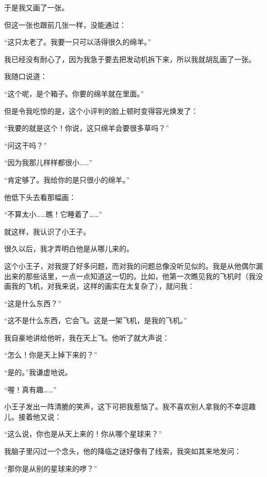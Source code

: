 于是我又画了一张。

但这一张也跟前几张一样，没能通过：

“这只太老了。我要一只可以活得很久的绵羊。”

我已经没有耐心了，因为我急于要去把发动机拆下来，所以我就胡乱画了一张。

我随口说道：

“这个呢，是个箱子。你要的绵羊就在里面。”

但是令我吃惊的是，这个小评判的脸上顿时变得容光焕发了：

“我要的就是这个！你说，这只绵羊会要很多草吗？”

“问这干吗？”

“因为我那儿样样都很小\ldots{}\ldots{}”

“肯定够了。我给你的是只很小的绵羊。”

{\startalignment[center]
 \stopalignment}

他低下头去看那幅画：

“不算太小\ldots{}\ldots{}瞧！它睡着了\ldots{}\ldots{}”

就这样，我认识了小王子。


\stoptitle

\starttitle[title={3},reference={part0005.html_a006}]

很久以后，我才弄明白他是从哪儿来的。

这个小王子，对我提了好多问题，而对我的问题总像没听见似的。我是从他偶尔漏出来的那些话里，一点一点知道这一切的。比如，他第一次瞧见我的飞机时（我没画我的飞机，对我来说，这样的画实在太复杂了），就问我：

“这是什么东西？”

“这不是什么东西，它会飞。这是一架飞机，是我的飞机。”

我自豪地讲给他听，我在天上飞。他听了就大声说：

“怎么！你是天上掉下来的？”

“是的。”我谦虚地说。

“喔！真有趣\ldots{}\ldots{}”

小王子发出一阵清脆的笑声，这下可把我惹恼了。我不喜欢别人拿我的不幸逗趣儿。接着他又说：

“这么说，你也是从天上来的！你从哪个星球来？”

我脑子里闪过一个念头，他的降临之谜好像有了线索，我突如其来地发问：

“那你是从别的星球来的啰？”

